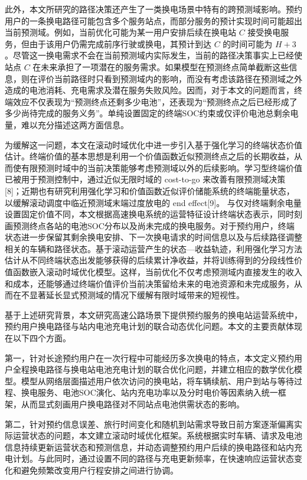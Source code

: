 此外，本文所研究的路径决策还产生了一类换电场景中特有的跨预测域影响。预约用户的一条换电路径可能包含多个服务站点，而部分服务的预计实现时间可能超出当前预测域。例如，当前优化可能为某一用户安排后续在换电站 \(C\) 接受换电服务，但由于该用户仍需完成前序行驶或换电，其预计到达 \(C\) 的时间可能为 \(H+3\)。尽管这一换电需求不会在当前预测域内实际发生，当前的路径决策事实上已经使站点 \(C\) 在未来承担了一项潜在的服务需求。如果模型在预测终点简单截断这些信息，则在评价当前路径时只看到预测域内的影响，而没有考虑该路径在预测域之外造成的电池消耗、充电需求及潜在服务失败风险。因而，对于本文的问题而言，终端效应不仅表现为“预测终点还剩多少电池”，还表现为“预测终点之后已经形成了多少尚待完成的服务义务”。单纯设置固定的终端SOC约束或仅评价电池总剩余电量，难以充分描述这两方面信息。

为缓解这一问题，本文在滚动时域优化中进一步引入基于强化学习的终端状态价值估计。终端价值的基本思想是利用一个价值函数近似预测终点之后的长期收益，从而使有限预测时域中的当前决策能够考虑预测域以外的后续影响。学习型终端价值已被用于预测控制中，通过近似无限时域的 cost-to-go 来改善有限预测域决策[8]；近期也有研究利用强化学习和价值函数近似评价储能系统的终端能量状态，以缓解滚动调度中临近预测域末端过度放电的 end effect[9]。 与仅对终端剩余电量设置固定价值不同，本文根据高速换电系统的运营特征设计终端状态表示，同时刻画预测终点各站的电池SOC分布以及尚未完成的换电服务。对于预约用户，终端状态进一步保留其剩余换电安排、下一次换电请求的时间信息以及与后续路径调整相关的车辆和路径状态。基于滚动运营产生的状态—收益轨迹，利用强化学习方法估计从不同终端状态出发能够获得的后续累计净收益，并将训练得到的分段线性价值函数嵌入滚动时域优化模型。这样，当前优化不仅考虑预测域内直接发生的收入和成本，还能够通过终端价值评价当前决策留给未来的电池资源和未完成服务，从而在不显著延长显式预测域的情况下缓解有限时域带来的短视性。

基于上述研究背景，本文研究高速公路场景下提供预约服务的换电站运营系统中，预约用户换电路径与站内电池充电计划的联合动态优化问题。本文的主要贡献体现在以下四个方面。

第一，针对长途预约用户在一次行程中可能经历多次换电的特点，本文定义预约用户全程换电路径与换电站电池充电计划的联合优化问题，并建立相应的数学优化模型。模型从网络层面描述用户依次访问的换电站，将车辆续航、用户到站与等待过程、换电服务、电池SOC演化、站内充电功率以及分时电价等因素纳入统一框架，从而显式刻画用户换电路径对不同站点电池供需状态的影响。

第二，针对预约信息误差、旅行时间变化和随机到站需求导致日前方案逐渐偏离实际运营状态的问题，本文建立滚动时域优化框架。系统根据实时车辆、请求及电池信息持续更新运营状态和预测信息，并动态调整预约用户后续的换电路径和站内充电计划。与此同时，通过设置不同的路径与充电更新频率，在快速响应运营状态变化和避免频繁改变用户行程安排之间进行协调。

